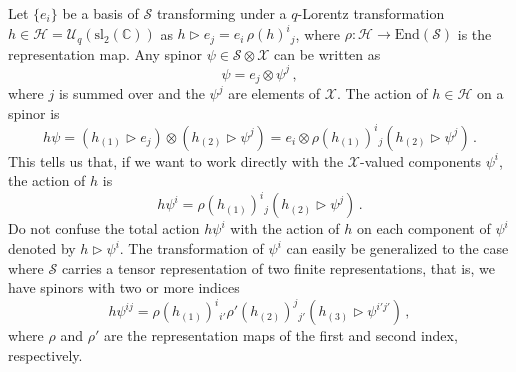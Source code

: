 \documentclass[12pt,a4paper]{article}
\newcommand{\tr}{\triangleright}
\newcommand{\Hcal}{\mathcal{H}}
\newcommand{\Xcal}{\mathcal{X}}
\newcommand{\Scal}{\mathcal{S}}
\newcommand{\slC}{{\mathcal{U}_q(\mathrm{sl}_2(\mathbb{C})) }}
\begin{document}
Let $\{ e_i \}$ be a basis of $\Scal$ transforming under a $q$-Lorentz
transformation $h\in\Hcal=\slC$ as $h\tr e_j = e_i \,\rho(h)^i{}_j$,
where $\rho : \Hcal \rightarrow \mathrm{End}(\Scal)$ is the
representation map. Any spinor $\psi \in \Scal \otimes \Xcal$ can be
written as
\begin{equation}
  \psi = e_j \otimes \psi^j \,,
\end{equation}
where $j$ is summed over and the $\psi^j$ are elements of $\Xcal$. The
action of $h\in\Hcal$ on a spinor is
\begin{equation}
  h\psi = (h_{(1)}\tr e_j) \otimes (h_{(2)}\tr \psi^j)
  = e_i\otimes \rho(h_{(1)})^i{}_j  (h_{(2)}\tr \psi^j) \,.
\end{equation}
This tells us that, if we want to work directly with the
$\Xcal$-valued components $\psi^i$, the action of $h$ is
\begin{equation}
\label{eq:Wave1}
  h\psi^i = \rho(h_{(1)})^i{}_j  (h_{(2)}\tr \psi^j) \,.
\end{equation}
Do not confuse the total action $h\psi^i$ with the action of $h$
on each component of $\psi^i$ denoted by $h\tr \psi^i$. The
transformation of $\psi^i$ can easily be generalized to the case where
$\Scal$ carries a tensor representation of two finite
representations, that is, we have spinors with two or more indices
\begin{equation}
\label{Wave2}
  h\psi^{ij} = \rho(h_{(1)})^i{}_{i'}
               \rho'(h_{(2)})^j{}_{j'}  (h_{(3)}\tr \psi^{i'j'}) \,,
\end{equation}
where $\rho$ and $\rho'$ are the representation maps of the first and
second index, respectively. 
\end{document}
